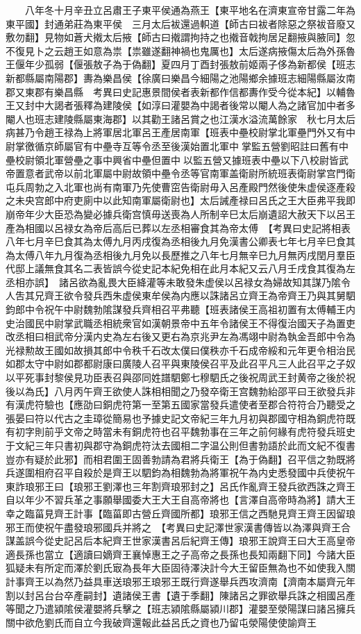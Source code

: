 　　八年冬十月辛丑立呂肅王子東平侯通為燕王【東平地名在濟東宣帝甘露二年為東平國】封通弟莊為東平侯　三月太后袚還過軹道【師古曰袚者除惡之祭袚音廢又敷勿翻】見物如蒼犬撠太后掖【師古曰撠謂拘持之也撠音戟拘居足翻掖與腋同】忽不復見卜之云趙王如意為祟【祟雖遂翻神禍也鬼厲也】太后遂病掖傷太后為外孫魯王偃年少孤弱【偃張敖子為于偽翻】夏四月丁酉封張敖前姬兩子侈為新都侯【班志新都縣屬南陽郡】夀為樂昌侯【徐廣曰樂昌今細陽之池陽鄉余據班志細陽縣屬汝南郡又東郡有樂昌縣　考異曰史記惠景間侯者表新都作信都夀作受今從本紀】以輔魯王又封中大謁者張釋為建陵侯【如淳曰灌嬰為中謁者後常以閹人為之諸官加中者多閹人也班志建陵縣屬東海郡】以其勸王諸呂賞之也江漢水溢流萬餘家　秋七月太后病甚乃令趙王禄為上將軍居北軍呂王產居南軍【班表中壘校尉掌北軍壘門外又有中尉掌徼循京師屬官有中壘寺互等令丞至後漢始置北軍中掌監五營劉昭註曰舊有中壘校尉領北軍營壘之事中興省中壘但置中以監五營又據班表中壘以下八校尉皆武帝置意者武帝以前北軍屬中尉故領中壘令丞等官南軍盖衛尉所統班表衛尉掌宫門衛屯兵周勃之入北軍也尚有南軍乃先使曹窋告衛尉毋入呂產殿門然後使朱虚侯逐產殺之未央宫郎中府吏廁中以此知南軍屬衛尉也】太后誡產禄曰呂氏之王大臣弗平我即崩帝年少大臣恐為變必據兵衛宫慎毋送喪為人所制辛巳太后崩遺詔大赦天下以呂王產為相國以呂禄女為帝后高后已葬以左丞相審食其為帝太傅　【考異曰史記將相表八年七月辛巳食其為太傅九月丙戌復為丞相後九月免漢書公卿表七年七月辛巳食其為太傅八年九月復為丞相後九月免以長歷推之八年七月無辛巳九月無丙戌閏月羣臣代邸上議無食其名二表皆誤今從史記本紀免相在此月本紀又云八月壬戌食其復為左丞相亦誤】　諸呂欲為亂畏大臣絳灌等未敢發朱虚侯以呂禄女為婦故知其謀乃隂令人吿其兄齊王欲令發兵西朱虚侯東牟侯為内應以誅諸呂立齊王為帝齊王乃與其舅駟鈞郎中令祝午中尉魏勃隂謀發兵齊相召平弗聽【班表諸侯王高祖初置有太傅輔王内史治國民中尉掌武職丞相統衆官如漢朝景帝中五年令諸侯王不得復治國天子為置吏改丞相曰相武帝分漢内史為左右後又更右為京兆尹左為馮翊中尉為執金吾郎中令為光禄勲故王國如故損其郎中令秩千石改太僕曰僕秩亦千石成帝綏和元年更令相治民如郡太守中尉如郡都尉康曰廣陵人召平與東陵侯召平及此召平凡三人此召平之子奴以平死事封黎侯見功臣表召與邵同姓譜駟鄭七穆駟氏之後祝周武王封黄帝之後於祝後以為氏】八月丙午齊王欲使人誅相相聞之乃發卒衛王宫魏勃紿邵平曰王欲發兵非有漢虎符驗也【應劭曰銅虎符第一至第五國家當發兵遣使者至郡合符符合乃聽受之張晏曰符以代古之圭璋從簡易也予據史記文帝紀三年九月初與郡國守相為銅虎符既有初字則前乎文帝之時當未有銅虎符也召平魏勃事在三年之前何緣有虎符發兵班史于文紀三年只書初與郡守為銅虎符汰去國相二字温公則但書勃語於此而文紀不復書豈亦有疑於此邪】而相君圍王固善勃請為君將兵衛王【為于偽翻】召平信之勃既將兵遂圍相府召平自殺於是齊王以駟鈞為相魏勃為將軍祝午為内史悉發國中兵使祝午東詐琅邪王曰【琅邪王劉澤也三年割齊琅邪封之】呂氏作亂齊王發兵欲西誅之齊王自以年少不習兵革之事願舉國委大王大王自高帝將也【言澤自高帝時為將】請大王幸之臨菑見齊王計事【臨菑即古營丘齊國所都】琅邪王信之西馳見齊王齊王因留琅邪王而使祝午盡發琅邪國兵并將之　【考異曰史記澤世家漢書傳皆以為澤與齊王合謀盖誤今從史記呂后本紀齊王世家漢書呂后紀齊王傳】琅邪王說齊王曰大王高皇帝適長孫也當立【適讀曰嫡齊王襄悼惠王之子高帝之長孫也長知兩翻下同】今諸大臣狐疑未有所定而澤於劉氏㝡為長年大臣固待澤決計今大王留臣無為也不如使我入關計事齊王以為然乃益具車送琅邪王琅邪王既行齊遂舉兵西攻濟南【濟南本屬齊元年割以封呂台台卒產嗣封】遺諸侯王書【遺于季翻】陳諸呂之罪欲舉兵誅之相國呂產等聞之乃遣潁隂侯灌嬰將兵擊之【班志潁隂縣屬潁川郡】灌嬰至滎陽謀曰諸呂擁兵關中欲危劉氏而自立今我破齊還報此益呂氏之資也乃留屯滎陽使使諭齊王